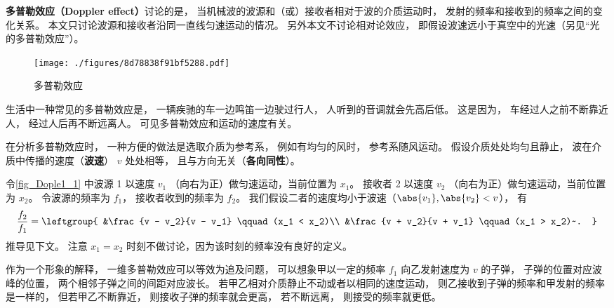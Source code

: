 

\textbf{多普勒效应（Doppler effect）}讨论的是， 当机械波的波源和（或）接收者相对于波的介质运动时， 发射的频率和接收到的频率之间的变化关系。 本文只讨论波源和接收者沿同一直线匀速运动的情况。 另外本文不讨论相对论效应， 即假设波速远小于真空中的光速（另见“光的多普勒效应”）。

\begin{figure}[ht]
\centering
\texttt{[image: ./figures/8d78838f91bf5288.pdf]}
\caption{多普勒效应} \label{fig_Dople1_1}
\end{figure}

\begin{example}{}
生活中一种常见的多普勒效应是， 一辆疾驰的车一边鸣笛一边驶过行人， 人听到的音调就会先高后低。 这是因为， 车经过人之前不断靠近人， 经过人后再不断远离人。 可见多普勒效应和运动的速度有关。
\end{example}

在分析多普勒效应时， 一种方便的做法是选取介质为参考系， 例如有均匀的风时， 参考系随风运动。 假设介质处处均匀且静止， 波在介质中传播的速度（\textbf{波速}） $v$ 处处相等， 且与方向无关（\textbf{各向同性}）。

令\autoref{fig_Dople1_1} 中波源 1 以速度 $v_1$ （向右为正）做匀速运动，当前位置为 $x_1$。 接收者 2 以速度 $v_2$ （向右为正）做匀速运动，当前位置为 $x_2$。 令波源的频率为 $f_1$， 接收者收到的频率为 $f_2$。 我们假设二者的速度均小于波速（$\abs{v_1}, \abs{v_2} < v$）， 有
\begin{equation}\label{eq_Dople1_1}
\frac{f_2}{f_1} = \leftgroup{
&\frac{v - v_2}{v - v_1} \qquad (x_1 < x_2)\\
&\frac{v + v_2}{v + v_1} \qquad (x_1 > x_2)~.
}\end{equation}
推导见下文。 注意 $x_1=x_2$ 时刻不做讨论，因为该时刻的频率没有良好的定义。

作为一个形象的解释， 一维多普勒效应可以等效为追及问题， 可以想象甲以一定的频率 $f_1$ 向乙发射速度为 $v$ 的子弹， 子弹的位置对应波峰的位置， 两个相邻子弹之间的间距对应波长。 若甲乙相对介质静止不动或者以相同的速度运动， 则乙接收到子弹的频率和甲发射的频率是一样的， 但若甲乙不断靠近， 则接收子弹的频率就会更高， 若不断远离， 则接受的频率就更低。

